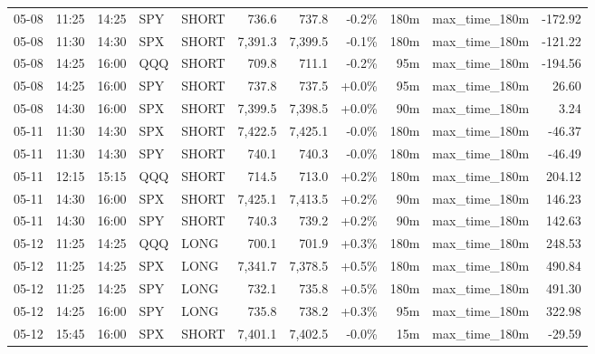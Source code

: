 \documentclass[11pt,a4paper,twoside]{article}
\begin{document}
\begin{center}
\begin{longtable}{>{\color{txtmain}}l l l l l r r r r >{\color{txtmain}}l r}
05-08 & 11:25 & 14:25 & SPY & SHORT & 736.6 & 737.8 & \textcolor{lossred}{-0.2\%} & 180m & max\_time\_180m & \textcolor{lossred}{-172.92} \\
05-08 & 11:30 & 14:30 & SPX & SHORT & 7,391.3 & 7,399.5 & \textcolor{lossred}{-0.1\%} & 180m & max\_time\_180m & \textcolor{lossred}{-121.22} \\
05-08 & 14:25 & 16:00 & QQQ & SHORT & 709.8 & 711.1 & \textcolor{lossred}{-0.2\%} & 95m & max\_time\_180m & \textcolor{lossred}{-194.56} \\
05-08 & 14:25 & 16:00 & SPY & SHORT & 737.8 & 737.5 & \textcolor{wingreen}{+0.0\%} & 95m & max\_time\_180m & \textcolor{wingreen}{26.60} \\
05-08 & 14:30 & 16:00 & SPX & SHORT & 7,399.5 & 7,398.5 & \textcolor{wingreen}{+0.0\%} & 90m & max\_time\_180m & \textcolor{wingreen}{3.24} \\
05-11 & 11:30 & 14:30 & SPX & SHORT & 7,422.5 & 7,425.1 & \textcolor{lossred}{-0.0\%} & 180m & max\_time\_180m & \textcolor{lossred}{-46.37} \\
05-11 & 11:30 & 14:30 & SPY & SHORT & 740.1 & 740.3 & \textcolor{lossred}{-0.0\%} & 180m & max\_time\_180m & \textcolor{lossred}{-46.49} \\
05-11 & 12:15 & 15:15 & QQQ & SHORT & 714.5 & 713.0 & \textcolor{wingreen}{+0.2\%} & 180m & max\_time\_180m & \textcolor{wingreen}{204.12} \\
05-11 & 14:30 & 16:00 & SPX & SHORT & 7,425.1 & 7,413.5 & \textcolor{wingreen}{+0.2\%} & 90m & max\_time\_180m & \textcolor{wingreen}{146.23} \\
05-11 & 14:30 & 16:00 & SPY & SHORT & 740.3 & 739.2 & \textcolor{wingreen}{+0.2\%} & 90m & max\_time\_180m & \textcolor{wingreen}{142.63} \\
05-12 & 11:25 & 14:25 & QQQ & LONG & 700.1 & 701.9 & \textcolor{wingreen}{+0.3\%} & 180m & max\_time\_180m & \textcolor{wingreen}{248.53} \\
05-12 & 11:25 & 14:25 & SPX & LONG & 7,341.7 & 7,378.5 & \textcolor{wingreen}{+0.5\%} & 180m & max\_time\_180m & \textcolor{wingreen}{490.84} \\
05-12 & 11:25 & 14:25 & SPY & LONG & 732.1 & 735.8 & \textcolor{wingreen}{+0.5\%} & 180m & max\_time\_180m & \textcolor{wingreen}{491.30} \\
05-12 & 14:25 & 16:00 & SPY & LONG & 735.8 & 738.2 & \textcolor{wingreen}{+0.3\%} & 95m & max\_time\_180m & \textcolor{wingreen}{322.98} \\
05-12 & 15:45 & 16:00 & SPX & SHORT & 7,401.1 & 7,402.5 & \textcolor{lossred}{-0.0\%} & 15m & max\_time\_180m & \textcolor{lossred}{-29.59} \\

\end{longtable}
\end{center}
\end{document}
